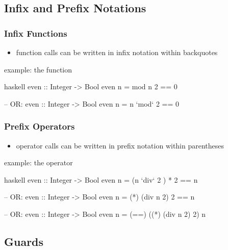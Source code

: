 \documentclass[dvipsnames]{beamer}
\theoremstyle{plain}
\begin{document}
\subsection{Infix and Prefix Notations}

\begin{frame}[fragile]
  \frametitle{Infix Functions}

  \begin{itemize}
    \item function calls can be written in infix notation within backquotes
  \end{itemize}

  \begin{exampleblock}{example: the  function}
    \begin{pygments}{haskell}
even :: Integer -> Bool
even n = mod n 2 == 0

-- OR:
even :: Integer -> Bool
even n = n `mod` 2 == 0
    \end{pygments}
  \end{exampleblock}
\end{frame}

\begin{frame}[fragile]
  \frametitle{Prefix Operators}

  \begin{itemize}
    \item operator calls can be written in prefix notation within parentheses
  \end{itemize}

  \begin{exampleblock}{example: the  operator}
    \begin{pygments}{haskell}
even :: Integer -> Bool
even n = (n `div` 2 ) * 2 == n

-- OR:
even :: Integer -> Bool
even n = (*) (div n 2) 2 == n

-- OR:
even :: Integer -> Bool
even n = (==) ((*) (div n 2) 2) n
    \end{pygments}
  \end{exampleblock}
\end{frame}

\subsection{Guards}
\end{document}
